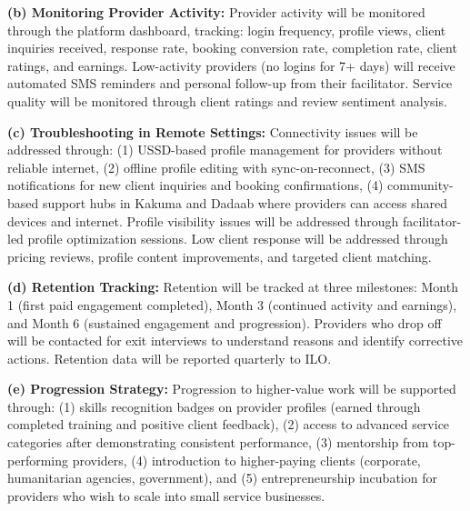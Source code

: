 \documentclass[11pt,a4paper]{article}
\begin{document}
\noindent \textbf{(b) Monitoring Provider Activity:} Provider activity will be monitored through the platform dashboard, tracking: login frequency, profile views, client inquiries received, response rate, booking conversion rate, completion rate, client ratings, and earnings. Low-activity providers (no logins for 7+ days) will receive automated SMS reminders and personal follow-up from their facilitator. Service quality will be monitored through client ratings and review sentiment analysis.

\noindent \textbf{(c) Troubleshooting in Remote Settings:} Connectivity issues will be addressed through: (1) USSD-based profile management for providers without reliable internet, (2) offline profile editing with sync-on-reconnect, (3) SMS notifications for new client inquiries and booking confirmations, (4) community-based support hubs in Kakuma and Dadaab where providers can access shared devices and internet. Profile visibility issues will be addressed through facilitator-led profile optimization sessions. Low client response will be addressed through pricing reviews, profile content improvements, and targeted client matching.

\noindent \textbf{(d) Retention Tracking:} Retention will be tracked at three milestones: Month 1 (first paid engagement completed), Month 3 (continued activity and earnings), and Month 6 (sustained engagement and progression). Providers who drop off will be contacted for exit interviews to understand reasons and identify corrective actions. Retention data will be reported quarterly to ILO.

\noindent \textbf{(e) Progression Strategy:} Progression to higher-value work will be supported through: (1) skills recognition badges on provider profiles (earned through completed training and positive client feedback), (2) access to advanced service categories after demonstrating consistent performance, (3) mentorship from top-performing providers, (4) introduction to higher-paying clients (corporate, humanitarian agencies, government), and (5) entrepreneurship incubation for providers who wish to scale into small service businesses.
\end{document}
